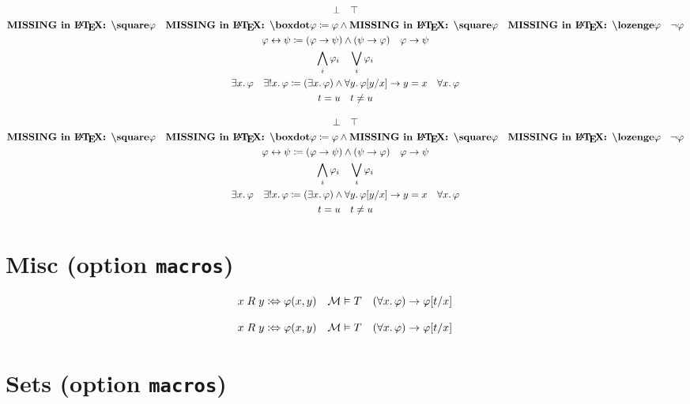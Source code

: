 \documentclass{article}
\begin{document}
\begin{verbatim*}
\begin{gather*}
\lfalse\quad
\ltrue\\
\lbox\varphi\quad
\lboxdot\varphi\coloneqq\varphi\land\lbox\varphi\quad
\ldia\varphi\quad
\lneg\varphi\\
\varphi\lbiimp\psi\coloneqq(\varphi\limp\psi)\land(\psi\limp\varphi)\quad
\varphi\limp\psi\\
\Land_{i}\varphi_{i}\quad
\Lor_{i}\varphi_{i}\\
\lexists x.\,\varphi\quad
\lexistsUnq x.\,\varphi\coloneqq
 (\lexists x.\,\varphi)\land\lforall y.\,\Subst{y}[x]{\varphi}\limp y\lEQ x\quad
\lforall x.\,\varphi\\
t\lEQ u\quad
t\lNEQ u
\end{gather*}
\end{verbatim*}
%
\begin{gather*}
  \lfalse \quad
  \ltrue \\
  \lbox\varphi \quad
  \lboxdot\varphi \coloneqq \varphi \land \lbox\varphi \quad
  \ldia\varphi \quad
  \lneg\varphi \\
  \varphi \lbiimp \psi \coloneqq (\varphi \limp \psi) \land (\psi \limp \varphi) \quad
  \varphi \limp \psi \\
  \Land_{i} \varphi_{i} \quad
  \Lor_{i} \varphi_{i} \\
  \lexists x.\,\varphi \quad
  \lexistsUnq x.\,\varphi \coloneqq (\lexists x.\,\varphi) \land \lforall y.\,\Subst{y}[x]{\varphi} \limp y \lEQ x \quad
  \lforall x.\,\varphi \\
  t \lEQ u \quad
  t \lNEQ u
\end{gather*}

\section{Misc (option \texttt{macros})}

\begin{verbatim*}
\[
x\mathrel{R}y\coloniff\varphi(x,y)\quad
\Mod[M]\vDash T\quad
(\lforall x.\,\varphi)\limp\Subst{t}[x]{\varphi}
\]
\end{verbatim*}
%
\[
  x \mathrel{R} y \coloniff \varphi(x,y) \quad
  \Mod[M] \vDash T \quad
  (\lforall x.\,\varphi) \limp \Subst{t}[x]{\varphi}
\]

\section{Sets (option \texttt{macros})}
\end{document}
